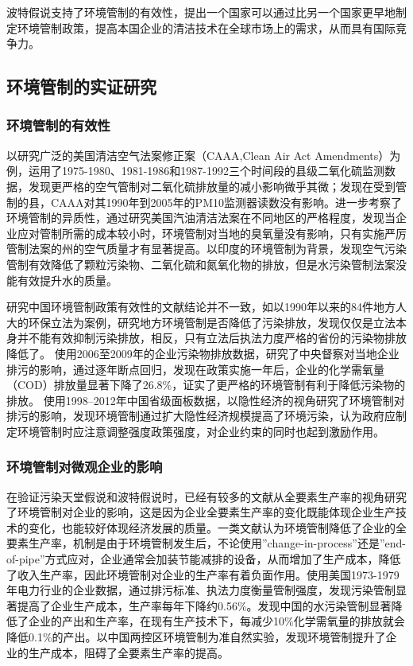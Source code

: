\documentclass{ctexart}
\begin{document}
波特假说支持了环境管制的有效性，\textcite{porter1995toward}提出一个国家可以通过比另一个国家更早地制定环境管制政策，提高本国企业的清洁技术在全球市场上的需求，从而具有国际竞争力。

\subsection{环境管制的实证研究}
\subsubsection{环境管制的有效性}
以研究广泛的美国清洁空气法案修正案（CAAA,Clean Air Act Amendments）为例，\textcite{greenstone2004did}运用了1975-1980、1981-1986和1987-1992三个时间段的县级二氧化硫监测数据，发现更严格的空气管制对二氧化硫排放量的减小影响微乎其微；\textcite{auffhammer2009measuring}发现在受到管制的县，CAAA对其1990年到2005年的PM10监测器读数没有影响。\textcite{auffhammer2011clearing}进一步考察了环境管制的异质性，通过研究美国汽油清洁法案在不同地区的严格程度，发现当企业应对管制所需的成本较小时，环境管制对当地的臭氧量没有影响，只有实施严厉管制法案的州的空气质量才有显著提高。\textcite{greenstone2014environmental}以印度的环境管制为背景，发现空气污染管制有效降低了颗粒污染物、二氧化硫和氮氧化物的排放，但是水污染管制法案没能有效提升水的质量。

研究中国环境管制政策有效性的文献结论并不一致，如\textcite{包群2013环境管制抑制了污染排放吗}以1990年以来的84件地方人大的环保立法为案例，研究地方环境管制是否降低了污染排放，发现仅仅是立法本身并不能有效抑制污染排放，相反，只有立法后执法力度严格的省份的污染物排放降低了。
\textcite{zhang2018does}使用2006至2009年的企业污染物排放数据，研究了中央督察对当地企业排污的影响，通过逐年断点回归，发现在政策实施一年后，企业的化学需氧量（COD）排放量显著下降了26.8\%，证实了更严格的环境管制有利于降低污染物的排放。
使用1998--2012年中国省级面板数据，\textcite{余长林2015环境管制对中国环境污染的影响}以隐性经济的视角研究了环境管制对排污的影响，发现环境管制通过扩大隐性经济规模提高了环境污染，认为政府应制定环境管制时应注意调整强度政策强度，对企业约束的同时也起到激励作用。
\subsubsection{环境管制对微观企业的影响}
在验证污染天堂假说和波特假说时，已经有较多的文献从全要素生产率的视角研究了环境管制对企业的影响，这是因为企业全要素生产率的变化既能体现企业生产技术的变化，也能较好体现经济发展的质量\cite{王杰2014环境规制与企业全要素生产率}。一类文献认为环境管制降低了企业的全要素生产率，机制是由于环境管制发生后，不论使用''change-in-process''还是''end-of-pipe''方式应对，企业通常会加装节能减排的设备，从而增加了生产成本，降低了收入生产率，因此环境管制对企业的生产率有着负面作用。\textcite{gollop1983environmental}使用美国1973-1979年电力行业的企业数据，通过排污标准、执法力度衡量管制强度，发现污染管制显著提高了企业生产成本，生产率每年下降约0.56\%。\textcite{wang2018environmental}发现中国的水污染管制显著降低了企业的产出和生产率，在现有生产技术下，每减少10\%化学需氧量的排放就会降低0.1\%的产出。\textcite{盛丹2019两控区环境管制与企业全要素生产率增长}以中国两控区环境管制为准自然实验，发现环境管制提升了企业的生产成本，阻碍了全要素生产率的提高。
\end{document}
